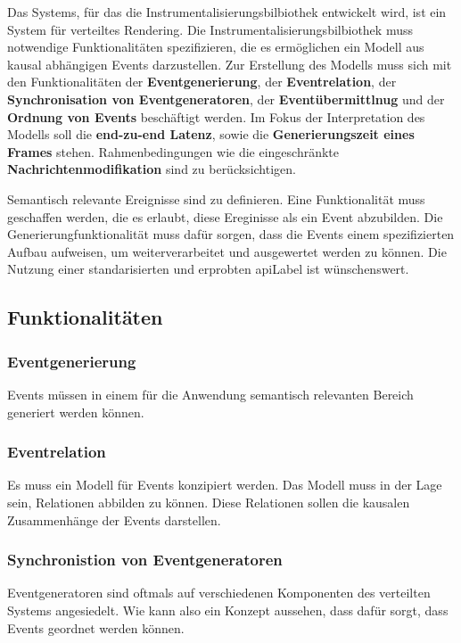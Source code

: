 Das Systems, für das die Instrumentalisierungsbilbiothek entwickelt wird, ist ein System für verteiltes Rendering. Die Instrumentalisierungsbilbiothek muss notwendige Funktionalitäten spezifizieren, die es ermöglichen ein Modell aus kausal abhängigen Events darzustellen. Zur Erstellung des Modells muss sich mit den Funktionalitäten der \textbf{Eventgenerierung}, der \textbf{Eventrelation}, der \textbf{Synchronisation von Eventgeneratoren}, der \textbf{Eventübermittlnug} und der \textbf{Ordnung von Events} beschäftigt werden. Im Fokus der Interpretation des Modells soll die \textbf{end-zu-end Latenz}, sowie die \textbf{Generierungszeit eines Frames} stehen. Rahmenbedingungen wie die eingeschränkte \textbf{Nachrichtenmodifikation} sind zu berücksichtigen.

Semantisch relevante Ereignisse sind zu definieren. Eine Funktionalität muss geschaffen werden, die es erlaubt, diese Ereginisse als ein Event abzubilden. Die Generierungfunktionalität muss dafür sorgen, dass die Events einem spezifizierten Aufbau aufweisen, um weiterverarbeitet und ausgewertet werden zu können. Die Nutzung einer standarisierten und erprobten \gls{apiLabel} ist wünschenswert.
 
\subsection{Funktionalitäten}

\subsubsection{Eventgenerierung}
\label{section:Eventgenerierung}
Events müssen in einem für die Anwendung semantisch relevanten Bereich generiert werden können. 

\subsubsection{Eventrelation}
\label{subsection:Eventkorrelation}
Es muss ein Modell für Events konzipiert werden. Das Modell muss in der Lage sein, Relationen abbilden zu können. Diese Relationen sollen die kausalen Zusammenhänge der Events darstellen. 

\subsubsection{Synchronistion von Eventgeneratoren}
\label{subsection:Synchronistion von Eventgeneratoren}
Eventgeneratoren sind oftmals auf verschiedenen Komponenten des verteilten Systems angesiedelt. Wie kann also ein Konzept aussehen, dass dafür sorgt, dass Events geordnet werden können.

